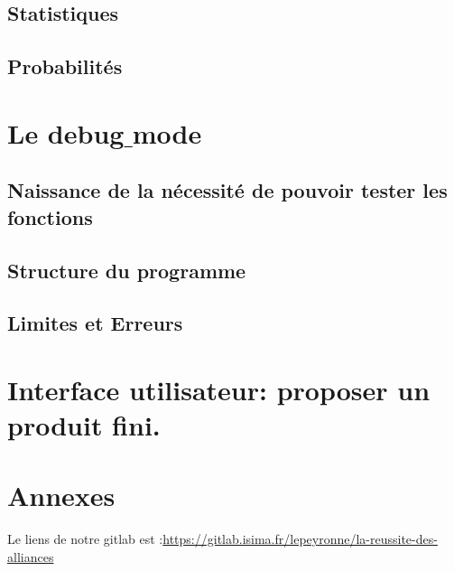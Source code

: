 \documentclass[10pt,a4paper,french,titlepage]{article}
\begin{document}
\subsection{Statistiques}
\subsection{Probabilités}
\section{Le debug$\_$mode}
\subsection{Naissance de la nécessité de pouvoir tester les fonctions}
\subsection{Structure du programme}
\subsection{Limites et Erreurs}
\section{Interface utilisateur: proposer un produit fini.}
\section{Annexes}



Le liens de notre gitlab est :\url{https://gitlab.isima.fr/lepeyronne/la-reussite-des-alliances}
\end{document}
